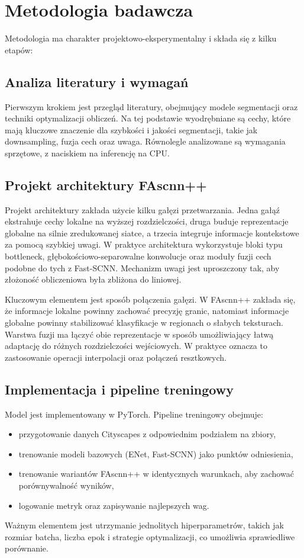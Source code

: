 \documentclass[12pt,oneside,a4paper]{report}
\begin{document}
\section{Metodologia badawcza}
Metodologia ma charakter projektowo-eksperymentalny i składa się z kilku etapów:

\subsection{Analiza literatury i wymagań}
Pierwszym krokiem jest przegląd literatury, obejmujący modele segmentacji oraz
techniki optymalizacji obliczeń. Na tej podstawie wyodrębniane są cechy, które
mają kluczowe znaczenie dla szybkości i jakości segmentacji, takie jak
downsampling, fuzja cech oraz uwaga. Równolegle analizowane są wymagania
sprzętowe, z naciskiem na inferencję na CPU.

\subsection{Projekt architektury FAscnn++}
Projekt architektury zakłada użycie kilku gałęzi przetwarzania. Jedna gałąź
ekstrahuje cechy lokalne na wyższej rozdzielczości, druga buduje reprezentacje
globalne na silnie zredukowanej siatce, a trzecia integruje informacje
kontekstowe za pomocą szybkiej uwagi. W praktyce architektura wykorzystuje
bloki typu bottleneck, głębokościowo-separowalne konwolucje oraz moduły fuzji
cech podobne do tych z Fast-SCNN. Mechanizm uwagi jest uproszczony tak, aby
złożoność obliczeniowa była zbliżona do liniowej.

Kluczowym elementem jest sposób połączenia gałęzi. W FAscnn++ zakłada się, że
informacje lokalne powinny zachować precyzję granic, natomiast informacje
globalne powinny stabilizować klasyfikacje w regionach o słabych teksturach.
Warstwa fuzji ma łączyć obie reprezentacje w sposób umożliwiający łatwą
adaptację do różnych rozdzielczości wejściowych. W praktyce oznacza to
zastosowanie operacji interpolacji oraz połączeń resztkowych.

\subsection{Implementacja i pipeline treningowy}
Model jest implementowany w PyTorch. Pipeline treningowy obejmuje:
\begin{itemize}
  \item przygotowanie danych Cityscapes z odpowiednim podziałem na zbiory,
  \item trenowanie modeli bazowych (ENet, Fast-SCNN) jako punktów odniesienia,
  \item trenowanie wariantów FAscnn++ w identycznych warunkach, aby zachować
        porównywalność wyników,
  \item logowanie metryk oraz zapisywanie najlepszych wag.
\end{itemize}
Ważnym elementem jest utrzymanie jednolitych hiperparametrów, takich jak
rozmiar batcha, liczba epok i strategie optymalizacji, co umożliwia sprawiedliwe
porównanie.
\end{document}
